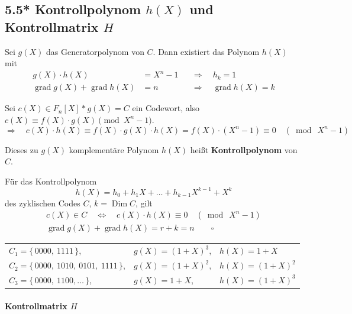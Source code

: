 \subsection{5.5* Kontrollpolynom $h(X)$ und Kontrollmatrix $H$}

Sei $g(X)$ das Generatorpolynom von $C$. Dann existiert das Polynom $h(X)$ mit
\begin{align*}
g(X)\cdot h(X) &= X^n - 1 & &\Rightarrow\quad h_k = 1 \\
\operatorname{grad} g(X) + \operatorname{grad} h(X) &= n & &\Rightarrow\quad \operatorname{grad} h(X) = k
\end{align*}

Sei $c(X) \in F_n[X] * g(X) = C$ ein Codewort, also $c(X) \equiv f(X)\cdot g(X) \pmod{X^n - 1}$.
\[
\Rightarrow\quad c(X)\cdot h(X) \equiv f(X)\cdot g(X)\cdot h(X) = f(X)\cdot(X^n - 1) \equiv 0 \quad (\bmod\ X^n - 1)
\]

\begin{definition}
Dieses zu $g(X)$ komplementäre Polynom $h(X)$ heißt \textbf{Kontrollpolynom} von $C$.
\end{definition}

\begin{satz}
Für das Kontrollpolynom
\[
h(X) = h_0 + h_1 X + \dots + h_{k-1} X^{k-1} + X^k
\]
des zyklischen Codes $C$, $k = \operatorname{Dim} C$, gilt
\begin{gather*}
c(X) \in C \quad\Leftrightarrow\quad c(X)\cdot h(X) \equiv 0 \quad (\bmod\ X^n - 1) \\
\operatorname{grad} g(X) + \operatorname{grad} h(X) = r + k = n \qquad \square
\end{gather*}
\end{satz}

\begin{beispiel}[$\mathbf{F}_2$: \ $X^4 - 1 = (X + 1)^4$]
{\small\begin{tabular}{@{}lll@{}}
$C_1 = \{\, 0000,\ 1111 \,\}$, & $g(X) = (1 + X)^3$, & $h(X) = 1 + X$ \\
$C_2 = \{\, 0000,\ 1010,\ 0101,\ 1111 \,\}$, & $g(X) = (1 + X)^2$, & $h(X) = (1 + X)^2$ \\
$C_3 = \{\, 0000,\ 1100, \dots \,\}$, & $g(X) = 1 + X$, & $h(X) = (1 + X)^3$
\end{tabular}}
\end{beispiel}

\paragraph{Kontrollmatrix $H$}

